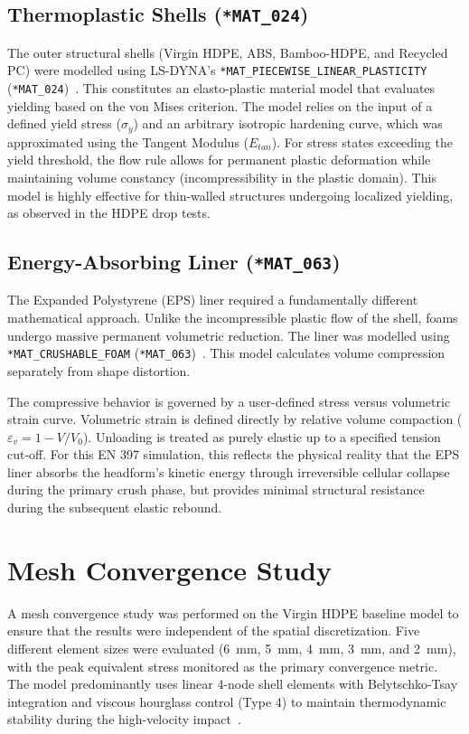 \subsection{Thermoplastic Shells (\texttt{*MAT\_024})}
The outer structural shells (Virgin HDPE, ABS, Bamboo-HDPE, and Recycled PC) were modelled using LS-DYNA's \texttt{*MAT\_PIECEWISE\_LINEAR\_PLASTICITY} (\texttt{*MAT\_024})~\cite{lsdyna_keyword}. This constitutes an elasto-plastic material model that evaluates yielding based on the von Mises criterion. The model relies on the input of a defined yield stress ($\sigma_y$) and an arbitrary isotropic hardening curve, which was approximated using the Tangent Modulus ($E_{tan}$). For stress states exceeding the yield threshold, the flow rule allows for permanent plastic deformation while maintaining volume constancy (incompressibility in the plastic domain). This model is highly effective for thin-walled structures undergoing localized yielding, as observed in the HDPE drop tests.

\subsection{Energy-Absorbing Liner (\texttt{*MAT\_063})}
The Expanded Polystyrene (EPS) liner required a fundamentally different mathematical approach. Unlike the incompressible plastic flow of the shell, foams undergo massive permanent volumetric reduction. The liner was modelled using \texttt{*MAT\_CRUSHABLE\_FOAM} (\texttt{*MAT\_063})~\cite{lsdyna_keyword}. This model calculates volume compression separately from shape distortion. 

The compressive behavior is governed by a user-defined stress versus volumetric strain curve. Volumetric strain is defined directly by relative volume compaction ($\varepsilon_v = 1 - V/V_0$). Unloading is treated as purely elastic up to a specified tension cut-off. For this EN 397 simulation, this reflects the physical reality that the EPS liner absorbs the headform's kinetic energy through irreversible cellular collapse during the primary crush phase, but provides minimal structural resistance during the subsequent elastic rebound.

\section{Mesh Convergence Study}

A mesh convergence study was performed on the Virgin HDPE baseline model to ensure that the results were independent of the spatial discretization. Five different element sizes were evaluated (6~mm, 5~mm, 4~mm, 3~mm, and 2~mm), with the peak equivalent stress monitored as the primary convergence metric. The model predominantly uses linear 4-node shell elements with Belytschko-Tsay integration and viscous hourglass control (Type 4) to maintain thermodynamic stability during the high-velocity impact~\cite{belytschko2013, lsdyna2021}.

